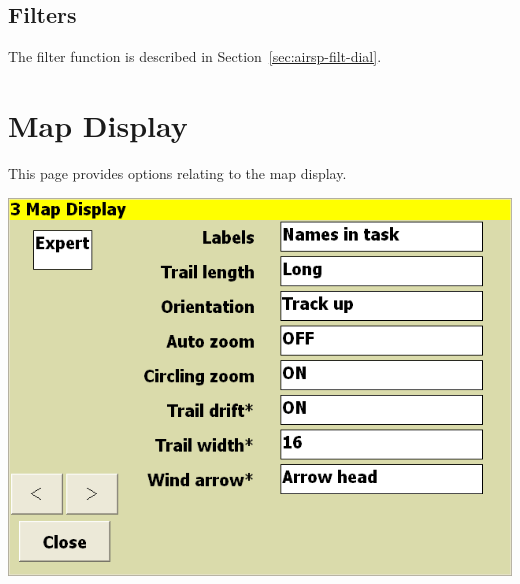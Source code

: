 \documentclass[a4paper,12pt]{refrep}
\begin{document}
\subsection*{Filters}
The filter function is described in Section~\ref{sec:airsp-filt-dial}.





\clearpage
\section{Map Display}\label{sec:map-display}

This page provides options relating to the map display.

\begin{center}
\includegraphics[angle=0,width=\linewidth,keepaspectratio='true']{figures/config-2.png}
\end{center}
\end{document}
